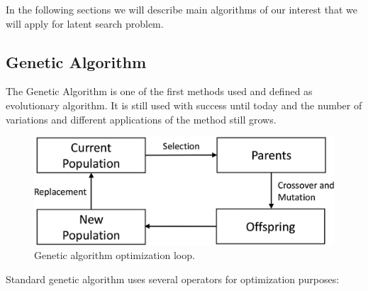\documentclass[12pt,a4paper,openany]{book}
\begin{document}
In the following sections we will describe main algorithms of our interest that we will apply for latent search problem. 
\subsection{Genetic Algorithm}


The Genetic Algorithm is one of the first methods used and defined as evolutionary algorithm. It is still used with success until today and the number of variations and different applications of the method still grows.

 \begin{figure}[ht!]
     \centering
     \includegraphics[scale=0.22]{figs/gen-algo.eps}
     \caption{Genetic algorithm optimization loop.}\label{Fig:genalgo1}
 \end{figure}


\noindent Standard genetic algorithm uses several operators for optimization purposes:



\end{document}
